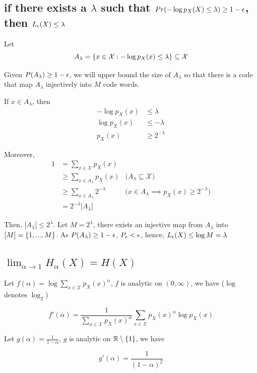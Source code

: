 \documentclass{article}
\begin{document}
\subsection{if there exists a $\lambda$ such that $Pr(-\log p_X(X) \leq \lambda) \geq 1 - \eps$, then $L_\eps(X) \leq \lambda$}

Let 
$$
    A_\lambda = \set*{x \in \mathcal{X}: -\log p_X(x) \leq \lambda} \subseteq \mathcal{X}
$$
    
Given $P(A_\lambda) \geq 1 - \eps$, we will upper bound the size of $A_\lambda$ so that there is a code that map $A_\lambda$ injectively into $M$ code words.

If $x \in A_\lambda$, then
\begin{align*}
    -\log p_X(x) &\leq \lambda \\
    \log p_X(x) &\leq -\lambda \\
    p_X(x) &\geq 2^{-\lambda}
\end{align*}


Moreover, 
\begin{align*}
    1
    &= \sum_{x \in \mathcal{X}} p_X(x) \\
    &\geq \sum_{x \in A_\lambda} p_X(x) &\text{($A_\lambda \subseteq \mathcal{X}$)}\\
    &\geq \sum_{x \in A_\lambda} 2^{-\lambda} &\text{($x \in A_\lambda \implies p_X(x) \geq 2^{-\lambda}$)}\\
    &= 2^{-\lambda} |A_\lambda|
\end{align*}

Then, $|A_\lambda| \leq 2^\lambda$. Let $M = 2^\lambda$, there exists an injective map from $A_\lambda$ into $[M] = \set{1, ..., M}$. As $P(A_\lambda) \geq 1 - \eps$, $P_e < \eps$, hence, $L_\eps(X) \leq \log M = \lambda$

\subsection{$\lim_{\alpha \to 1} H_\alpha(X) = H(X)$}

Let $f(\alpha) = \log \sum_{x \in \mathcal{X}} p_X(x)^\alpha$, $f$ is analytic on $(0, \infty)$, we have ($\log$ denotes $\log_2$)

$$
    f'(\alpha) = \frac{1}{\sum_{x \in \mathcal{X}} p_X(x)^\alpha} \sum_{x \in \mathcal{X}} p_X(x)^\alpha \log p_X(x)
$$

Let $g(\alpha) = \frac{1}{1-\alpha}$, $g$ is analytic on $\R \setminus \set{1}$, we have

$$
    g'(\alpha) = \frac{1}{(1-\alpha)^2}
$$
\end{document}
